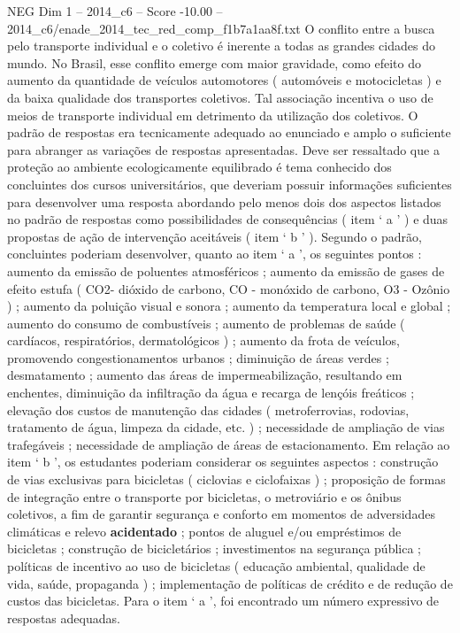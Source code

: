 \begin{textsample}{NEG Dim 1 – 2014\_c6 – Score -10.00 – 2014\_c6/enade\_2014\_tec\_red\_comp\_f1b7a1aa8f.txt}
O conflito entre a busca pelo transporte individual e o coletivo é inerente a todas as grandes cidades do mundo.
No Brasil, esse conflito emerge com maior gravidade, como efeito do aumento da quantidade de veículos automotores ( automóveis e motocicletas ) e da baixa qualidade dos transportes coletivos.
Tal associação incentiva o uso de meios de transporte individual em detrimento da utilização dos coletivos.
O padrão de respostas era tecnicamente adequado ao enunciado e amplo o suficiente para abranger as variações de respostas apresentadas.
Deve ser ressaltado que a proteção ao ambiente ecologicamente equilibrado é tema conhecido dos concluintes dos cursos universitários, que deveriam possuir informações suficientes para desenvolver uma resposta abordando pelo menos dois dos aspectos listados no padrão de respostas como possibilidades de consequências ( item ‘ a ’ ) e duas propostas de ação de intervenção aceitáveis ( item ‘ b ’ ).
Segundo o padrão, concluintes poderiam desenvolver, quanto ao item ‘ a ’, os seguintes pontos : aumento da emissão de poluentes atmosféricos ; aumento da emissão de gases de efeito estufa ( CO2- dióxido de carbono, CO - monóxido de carbono, O3 - Ozônio ) ; aumento da poluição visual e sonora ; aumento da temperatura local e global ; aumento do consumo de combustíveis ; aumento de problemas de saúde ( cardíacos, respiratórios, dermatológicos ) ; aumento da frota de veículos, promovendo congestionamentos urbanos ; diminuição de áreas verdes ; desmatamento ; aumento das áreas de impermeabilização, resultando em enchentes, diminuição da infiltração da água e recarga de lençóis freáticos ; elevação dos custos de manutenção das cidades ( metroferrovias, rodovias, tratamento de água, limpeza da cidade, etc. ) ; necessidade de ampliação de vias trafegáveis ; necessidade de ampliação de áreas de estacionamento.
Em relação ao item ‘ b ’, os estudantes poderiam considerar os seguintes aspectos : construção de vias exclusivas para bicicletas ( ciclovias e ciclofaixas ) ; proposição de formas de integração entre o transporte por bicicletas, o metroviário e os ônibus coletivos, a fim de garantir segurança e conforto em momentos de adversidades climáticas e relevo \textbf{acidentado} ; pontos de aluguel e/ou empréstimos de bicicletas ; construção de bicicletários ; investimentos na segurança pública ; políticas de incentivo ao uso de bicicletas ( educação ambiental, qualidade de vida, saúde, propaganda ) ; implementação de políticas de crédito e de redução de custos das bicicletas.
Para o item ‘ a ’, foi encontrado um número expressivo de respostas adequadas.

\end{textsample}
